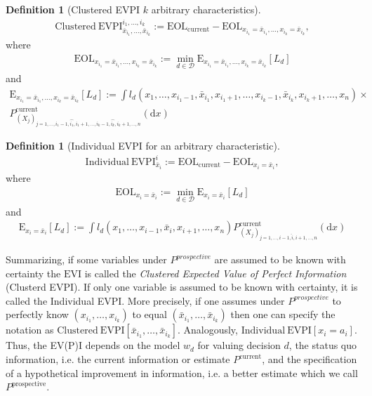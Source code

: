\documentclass[a4paper,10pt,twoside,pagesize,abstracton]{scrartcl}
\renewcommand{\d}{\mathrm{d}\!} %
\newcommand{\E}[2][]{\mathrm{E}_{#1}\left[#2\right]} %
\newcommand{\EOL}[1][]{\mathrm{EOL}_{#1}} %
\newcommand{\EVI}{\mathrm{EVI}} %
\newcommand{\EVPI}{\mathrm{EVPI}} %
\theoremstyle{plain}%
\theoremstyle{definition}
\newtheorem{defn}[thm]{Definition}
\theoremstyle{remark}
\begin{document}
\begin{defn}[Clustered EVPI $k$ arbitrary characteristics]
\begin{align}
   \mathrm{Clustered~}\EVPI^{i_1, \ldots, i_k}_{\bar{x}_{i_1}, \ldots, \bar{x}_{i_k}} := \EOL[\mathrm{current}] - \EOL[x_{i_1} =\bar{x}_{i_1}, \ldots, x_{i_k} = \bar{x}_{i_k}],
\end{align}
where 
\begin{align}
  \EOL[x_{i_1} =\bar{x}_{i_1}, \ldots, x_{i_k} = \bar{x}_{i_k}] := \min_{d\in\mathcal{D}} \E[x_{i_1} =\bar{x}_{i_1}, \ldots, x_{i_k} = \bar{x}_{i_k}]{L_d}
\end{align}
and 
\begin{align}
   \E[x_{i_1} =\bar{x}_{i_1}, \ldots, x_{i_k} = \bar{x}_{i_k}]{L_d} := \int l_d \left(
										x_1, \ldots, x_{i_1 - 1}, \bar{x}_{i_1}, x_{i_1 + 1}, \ldots, x_{i_k - 1}, \bar{x}_{i_k}, x_{i_k + 1}, \ldots, x_n   
										\right) \times\nonumber\\
										P_{\left(X_j\right)_{j={1, \ldots, i_1 - 1, \hat{i_1}, i_1 +1, \ldots, i_k -1, \hat{i_k}, i_k +1, \ldots, n}}}^{\mathrm{current}}\left(\d x\right)
\end{align}
\end{defn}
\begin{defn}[Individual EVPI for an arbitrary characteristic]
  
\begin{align}
   \mathrm{Individual~}\EVPI^i_{\bar{x}_i} := \EOL[\mathrm{current}] - \EOL[x_i =\bar{x}_i],
\end{align}
where 
\begin{align}
  \EOL[x_i =\bar{x}_i] := \min_{d\in\mathcal{D}} \E[x_i =\bar{x}_i]{L_d}
\end{align}
and 
\begin{align}
   \E[x_i =\bar{x}_i]{L_d} := \int l_d \left( x_1, \ldots, x_{i - 1}, \bar{x}_i, x_{i + 1}, \ldots,  x_n   \right) 
					P_{\left(X_j\right)_{j={1, \ldots, i - 1, \hat{i}, i +1, \ldots, n}}}^{\mathrm{current}}\left(\d x\right)
\end{align}
\end{defn}
 Summarizing, if some variables under $P^{prospective}$ are assumed to be known with certainty the $\EVI$ is called the \emph{Clustered Expected Value of Perfect Information} (Clusterd EVPI). If only one variable is assumed to be known with certainty, it is called the Individual EVPI. More precisely, if one assumes under $P^{prospective}$ to perfectly know $(x_{i_1}, \ldots, x_{i_k})$ to equal $(\bar{x}_{i_1}, \ldots, \bar{x}_{i_k})$ then one can specify the notation as $\mathrm{Clustered~}\EVPI[\bar{x}_{i_1}, \ldots, \bar{x}_{i_k}]$. Analogously, $\mathrm{Individual~}\EVPI[x_i = a_i]$. Thus, the EV(P)I depends on the model $w_d$ for valuing  decision $d$, the status quo information, i.e. the current information or estimate $P^\mathrm{current}$, and the specification of a hypothetical improvement in information, i.e. a better estimate which we call $P^\mathrm{prospective}$.
\end{document}
